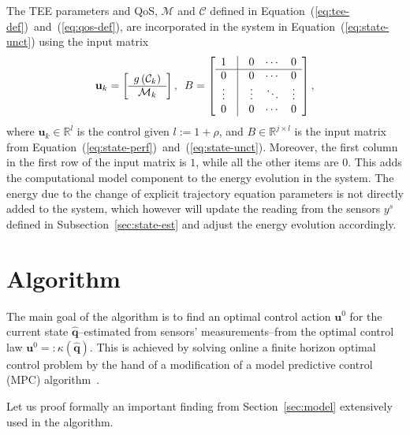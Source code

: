 \documentclass[letterpaper,10pt,conference]{ieeeconf}
\begin{document}
The TEE parameters and QoS, $\mathcal{M}$ and $\mathcal{C}$ defined in Equation~(\ref{eq:tee-def})~and~(\ref{eq:qos-def}), are incorporated in the system in Equation~(\ref{eq:state-unct}) using the input matrix
\begin{equation}
  \mathbf{u}_k=\left[\begin{array}{c}
    g\left(\mathcal{C}_k\right) \\\hline \mathcal{M}_k
  \end{array}\right],\,\,\,
  B=\left[\begin{array}{ccccccc}
    1 & \vline & 0 & \cdots & 0\\\hline
    0 & \vline & 0 & \cdots & 0\\
    \vdots & \vline & \vdots & \ddots & \vdots\\
    0 & \vline & 0 & \cdots & 0
  \end{array}\right],
\end{equation}
where $\mathbf{u}_k\in\mathbb{R}^l$ is the control given $l:=1+\rho$, and $B\in\mathbb{R}^{j\times l}$ is the input matrix from Equation~(\ref{eq:state-perf})~and~(\ref{eq:state-unct}). Moreover, the first column in the first row of the input matrix is $1$, while all the other items are $0$. This adds the computational model component to the energy evolution in the system. The energy due to the change of explicit trajectory equation parameters is not directly added to the system, which however will update the reading from the sensors $y^s$ defined in Subsection~\ref{sec:state-est} and adjust the energy evolution accordingly.

\section{Algorithm}
\label{sec:algo}

The main goal of the algorithm is to find an optimal control action $\mathbf{u}^0$ for the current state $\hat{\mathbf{q}}$--estimated from sensors' measurements--from the optimal control law $\mathbf{u}^0=:\kappa(\hat{\mathbf{q}})$. This is achieved by solving online a finite horizon optimal control problem by the hand of a modification of a model predictive control (MPC) algorithm~\cite{rawlings2017model}.

Let us proof formally an important finding from Section~\ref{sec:model} extensively used in the algorithm.

\end{document}

